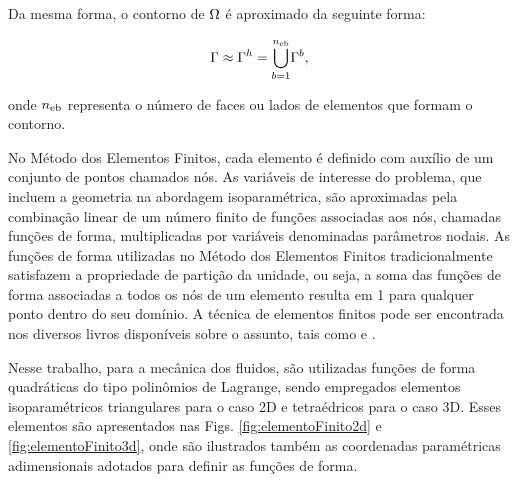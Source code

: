 \documentclass[tese_patricia]{subfiles}%
\begin{document}
Da mesma forma, o contorno de $\Omega$ é aproximado da seguinte forma:

\begin{align}
	\Gamma \approx \Gamma^h = {\bigcup_{b = 1}^{n_{\mathrm{eb}}}} \Gamma^{b},
\end{align}

\noindent onde $n_{\mathrm{eb}}$ representa o número de faces ou lados de elementos que formam o contorno.

No Método dos Elementos Finitos, cada elemento é definido com auxílio de um conjunto de pontos chamados nós. As variáveis de interesse do problema, que incluem a geometria na abordagem isoparamétrica, são aproximadas pela combinação linear de um número finito de funções associadas aos nós, chamadas funções de forma, multiplicadas por variáveis denominadas parâmetros nodais. As funções de forma utilizadas no Método dos Elementos Finitos tradicionalmente satisfazem a propriedade de partição da unidade, ou seja, a soma das funções de forma associadas a todos os nós de um elemento resulta em 1 para qualquer ponto dentro do seu domínio. A técnica de elementos finitos pode ser encontrada nos diversos livros disponíveis sobre o assunto, tais como  e .

Nesse trabalho, para a mecânica dos fluidos, são utilizadas funções de forma quadráticas do tipo polinômios de Lagrange, sendo empregados elementos isoparamétricos triangulares para o caso 2D e tetraédricos para o caso 3D. Esses elementos são apresentados nas Figs. \ref{fig:elementoFinito2d} e \ref{fig:elementoFinito3d}, onde são ilustrados também as coordenadas paramétricas adimensionais adotados para definir as funções de forma. 
\end{document}
